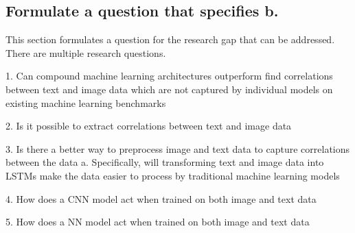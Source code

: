 \subsection{Formulate a question that specifies b.}

This section formulates a question for the research gap that can be addressed.  There are multiple research questions.


1. Can compound machine learning architectures outperform find correlations between text and image data which are not captured by individual models on existing machine learning benchmarks

2. Is it possible to extract correlations between text and image data  %

3. Is there a better way to preprocess image and text data to capture correlations between the data%
a. Specifically, will transforming text and image data into LSTMs make the data easier to process by traditional machine learning models

4. How does a CNN model act when trained on both image and text data  %

5. How does a NN model act when trained on both image and text data
